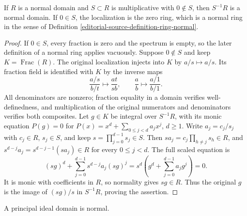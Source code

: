 \begin{lemma}
\label{editorial-source-lemma-localize-normal-domain}
If $R$ is a normal domain and $S\subset R$ is multiplicative
with $0\notin S$, then $S^{-1}R$ is a normal domain.
If $0\in S$, the localization is the zero ring, which is a normal
ring in the sense of Definition \ref{editorial-source-definition-ring-normal}.
\end{lemma}

\begin{proof}
If $0\in S$, every fraction is zero and the spectrum is empty,
so the later definition of a normal ring applies vacuously.
Suppose $0\notin S$ and keep $K=\operatorname{Frac}(R)$.
The original localization injects into $K$ by $a/s\mapsto a/s$.
Its fraction field is identified with $K$ by the inverse maps
$$
\frac{a/s}{b/t}\longmapsto\frac{at}{sb},\qquad
\frac ab\longmapsto\frac{a/1}{b/1}.
$$
All denominators are nonzero; fraction equality in a domain
verifies well-definedness, and multiplication of the original
numerators and denominators verifies both composites.
Let $g\in K$ be integral over $S^{-1}R$, with its monic equation
$P(g)=0$ for $P(x)=x^d+\sum_{0\leq j<d}a_jx^j$, $d\geq1$.
Write $a_j=c_j/s_j$ with $c_j\in R$, $s_j\in S$, and keep
$s=\prod_{j=0}^{d-1}s_j\in S$.
Then $sa_j=c_j\prod_{h\ne j}s_h\in R$, and
$s^{d-j}a_j=s^{d-j-1}(sa_j)\in R$ for every $0\leq j<d$.
The full scaled equation is
$$
(sg)^d+\sum_{j=0}^{d-1}s^{d-j}a_j(sg)^j
=s^d\left(g^d+\sum_{j=0}^{d-1}a_jg^j\right)=0.
$$
It is monic with coefficients in $R$, so normality gives
$sg\in R$. Thus the original $g$ is the image of $(sg)/s$
in $S^{-1}R$, proving the assertion.
\end{proof}

\begin{lemma}
\label{editorial-source-lemma-PID-normal}
A principal ideal domain is normal.
\end{lemma}

